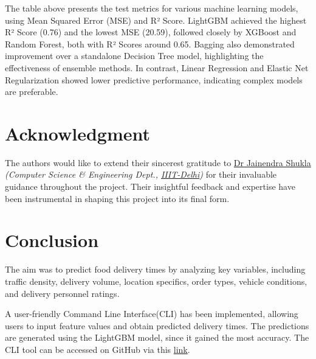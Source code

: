 \documentclass[10pt,twocolumn,letterpaper]{article}
\begin{document}
    The table above presents the test metrics for various machine learning models, using Mean Squared Error (MSE) and R² Score. LightGBM achieved the highest R² Score (0.76) and the lowest MSE (20.59), followed closely by XGBoost and Random Forest, both with R² Scores around 0.65. Bagging also demonstrated improvement over a standalone Decision Tree model, highlighting the effectiveness of ensemble methods. In contrast, Linear Regression and Elastic Net Regularization showed lower predictive performance, indicating complex models are preferable.

\section*{Acknowledgment}
    The authors would like to extend their sincerest gratitude to \href{https://www.iiitd.ac.in/jainendra}{Dr Jainendra Shukla} \textit{(Computer Science \& Engineering Dept., \href{https://www.iiitd.ac.in/}{IIIT-Delhi})} for their invaluable guidance throughout the project.
    Their insightful feedback and expertise have been instrumental in shaping this project into its final form.

\section*{Conclusion}
    The aim was to predict food delivery times by analyzing key variables, including traffic density, delivery volume, location specifics, order types, vehicle conditions, and delivery personnel ratings.
    
    A user-friendly Command Line Interface(CLI) has been implemented, allowing users to input feature values and obtain predicted delivery times. The predictions are generated using the LightGBM model, since it gained the most accuracy. The CLI tool can be accessed on GitHub via this \href{https://github.com/Vikranth3140/Food-Delivery-Time-Prediction/blob/main/main.py}{link}.

\newpage




\nocite{*}
\end{document}
